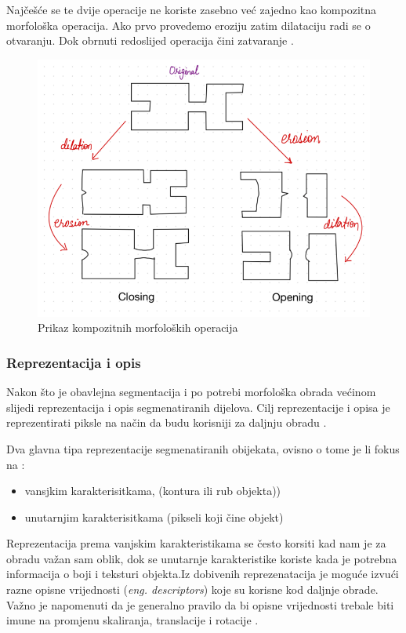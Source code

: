 \documentclass{foi}
\begin{document}
Najčešće se te dvije operacije ne koriste zasebno već zajedno kao kompozitna morfološka operacija. Ako prvo provedemo eroziju zatim dilataciju radi se o otvaranju. Dok obrnuti redoslijed operacija čini zatvaranje \cite{morph}.

\begin{figure}[H]
    \centering
    \includegraphics[width=0.6\linewidth]{slike/otvaranje_zatvaranje.png}
    \caption{Prikaz kompozitnih morfoloških operacija \cite{morph}}
\end{figure}

\subsubsection{Reprezentacija i opis}
Nakon što je obavlejna segmentacija i po potrebi morfološka obrada većinom slijedi reprezentacija i opis segmenatiranih dijelova. Cilj reprezentacije i opisa je reprezentirati piksle na način da budu korisniji za daljnju obradu \cite{RepAndDesc}. 

\begin{flushleft}
    Dva glavna tipa reprezentacije segmenatiranih obijekata, ovisno o tome je li fokus na \cite{RepAndDesc}:

\begin{itemize}
    \item vansjkim karakterisitkama, (kontura ili rub objekta))
    \item unutarnjim karakterisitkama (pikseli koji čine objekt)
\end{itemize}
\end{flushleft}

Reprezentacija prema vanjskim karakteristikama se često korsiti kad nam je za obradu važan sam oblik, dok se unutarnje karakteristike koriste kada je potrebna informacija o boji i teksturi objekta.Iz dobivenih reprezenatacija je moguće izvući razne opisne vrijednosti (\textit{eng. descriptors}) koje su korisne kod daljnje obrade. Važno je napomenuti da je generalno pravilo da bi opisne vrijednosti trebale biti imune na promjenu skaliranja, translacije i rotacije \cite{RepAndDesc}.
\end{document}
